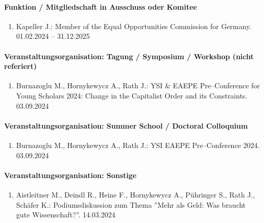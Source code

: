 \paragraph{Funktion / Mitgliedschaft in Ausschuss oder Komitee}
\begin{enumerate}[leftmargin=*, labelsep=0.5cm]
\item Kapeller J.: Member of the Equal Opportunities Commission for Germany. 01.02.2024 -- 31.12.2025
\end{enumerate}
\paragraph{Veranstaltungsorganisation: Tagung / Symposium / Workshop (nicht referiert)}
\begin{enumerate}[leftmargin=*, labelsep=0.5cm]
\item Burnazoglu M., Hornykewycz A., Rath J.: YSI \& EAEPE Pre--Conference for Young Scholars 2024: Change in the Capitalist Order and its Constraints. 03.09.2024
\end{enumerate}
\paragraph{Veranstaltungsorganisation: Summer School / Doctoral Colloquium}
\begin{enumerate}[leftmargin=*, labelsep=0.5cm]
\item Burnazoglu M., Hornykewycz A., Rath J.: YSI EAEPE Pre--Conference 2024. 03.09.2024
\end{enumerate}
\paragraph{Veranstaltungsorganisation: Sonstige}
\begin{enumerate}[leftmargin=*, labelsep=0.5cm]
\item Aistleitner M., Deindl R., Heine F., Hornykewycz A., Pühringer S., Rath J., Schäfer K.: Podiumsdiskussion zum Thema ''Mehr als Geld: Was braucht gute Wissenschaft?''. 14.03.2024
\end{enumerate}

